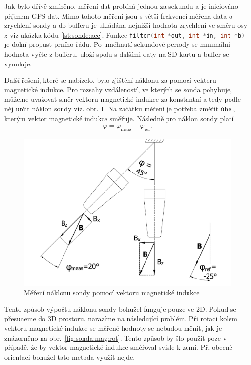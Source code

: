 \documentclass[twoside]{ctuthesis}
\theoremstyle{plain}
\theoremstyle{definition}
\theoremstyle{note}
\begin{document}
	Jak bylo dřívě zmíněno, měření dat probíhá jednou za sekundu a je iniciováno příjmem GPS dat. Mimo tohoto měření jsou s větší frekvencí měřena data o zrychlení sondy a do bufferu je ukládána nejnižší hodnota zrychlení ve směru osy $z$ viz ukázka kódu \ref{lst:sonde:acc}. Funkce \lstinline[language=C]|filter(int *out, int *in, int *b)| je dolní propust prního řádu. Po uměhnutí sekundové periody se minimální hodnota vyčte z bufferu, uloží spolu s dalšími daty na SD kartu a buffer se vynuluje.
		


	Další řešení, které se nabízelo, bylo zjištění náklonu za pomoci vektoru magnetické indukce. Pro rozsahy vzdáleností, ve kterých se sonda pohybuje, můžeme uvažovat směr vektoru magnetické indukce za konstantní a tedy podle něj určit náklon sondy viz. obr. \ref{fig:sonda:mag}. Na začátku měření je potřeba změřit úhel, kterým vektor magnetické indukce směřuje. Následně pro náklon sondy platí
	\begin{align}
		\varphi = \varphi_\text{meas} - \varphi_\text{ref}.
	\end{align}

	\begin{figure}[hbtp]
		\centering
		\includegraphics[width=.5\textwidth]{Figures/sonda_naklon_mag.pdf}
		\caption{Měření náklonu sondy pomocí vektoru magnetické indukce}
		\label{fig:sonda:mag}
	\end{figure}

	Tento způsob výpočtu náklonu sondy bohužel funguje pouze ve 2D. Pokud se přesuneme do 3D prostoru, narazíme na následující problém. Při rotaci kolem vektoru magnetické indukce se měřené hodnoty se nebudou měnit, jak je znázorněno na obr.~\ref{fig:sonda:mag:rot}. Tento způsob by šlo použít poze v případě, že by vektor magnetické indukce směřoval svisle k zemi. Při obecné orientaci bohužel tato metoda využít nejde.
\end{document}
